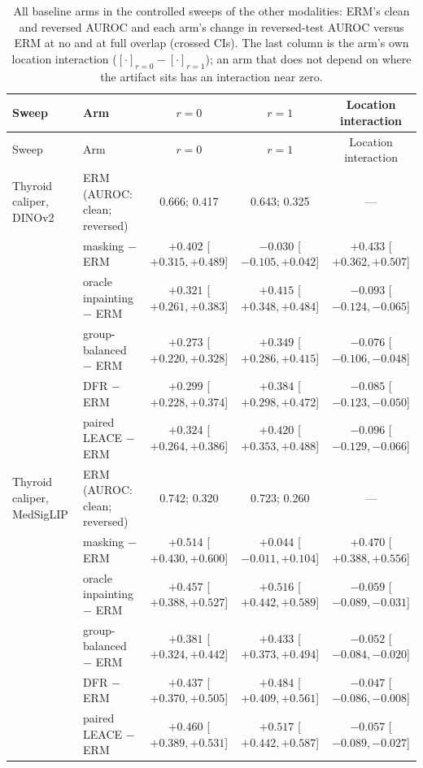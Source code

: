 {\scriptsize
\begin{longtable}{p{2.6cm}p{3.2cm}ccc}
\caption{All baseline arms in the controlled sweeps of the other modalities: ERM's clean and reversed AUROC and each arm's change in reversed-test AUROC versus ERM at no and at full overlap (crossed CIs). The last column is the arm's own location interaction ($[\cdot]_{r=0}-[\cdot]_{r=1}$); an arm that does not depend on where the artifact sits has an interaction near zero.}\label{tab:otherarms}\\\toprule
Sweep & Arm & $r=0$ & $r=1$ & Location interaction \\\midrule
\endfirsthead
\toprule Sweep & Arm & $r=0$ & $r=1$ & Location interaction \\\midrule
\endhead
\bottomrule
\endlastfoot
Thyroid caliper, DINOv2 & ERM (AUROC: clean; reversed) & 0.666; 0.417 & 0.643; 0.325 & --- \\
 & masking $-$ ERM & $+0.402$ [$+0.315, +0.489$] & $-0.030$ [$-0.105, +0.042$] & $+0.433$ [$+0.362, +0.507$] \\
 & oracle inpainting $-$ ERM & $+0.321$ [$+0.261, +0.383$] & $+0.415$ [$+0.348, +0.484$] & $-0.093$ [$-0.124, -0.065$] \\
 & group-balanced $-$ ERM & $+0.273$ [$+0.220, +0.328$] & $+0.349$ [$+0.286, +0.415$] & $-0.076$ [$-0.106, -0.048$] \\
 & DFR $-$ ERM & $+0.299$ [$+0.228, +0.374$] & $+0.384$ [$+0.298, +0.472$] & $-0.085$ [$-0.123, -0.050$] \\
 & paired LEACE $-$ ERM & $+0.324$ [$+0.264, +0.386$] & $+0.420$ [$+0.353, +0.488$] & $-0.096$ [$-0.129, -0.066$] \\
Thyroid caliper, MedSigLIP & ERM (AUROC: clean; reversed) & 0.742; 0.320 & 0.723; 0.260 & --- \\
 & masking $-$ ERM & $+0.514$ [$+0.430, +0.600$] & $+0.044$ [$-0.011, +0.104$] & $+0.470$ [$+0.388, +0.556$] \\
 & oracle inpainting $-$ ERM & $+0.457$ [$+0.388, +0.527$] & $+0.516$ [$+0.442, +0.589$] & $-0.059$ [$-0.089, -0.031$] \\
 & group-balanced $-$ ERM & $+0.381$ [$+0.324, +0.442$] & $+0.433$ [$+0.373, +0.494$] & $-0.052$ [$-0.084, -0.020$] \\
 & DFR $-$ ERM & $+0.437$ [$+0.370, +0.505$] & $+0.484$ [$+0.409, +0.561$] & $-0.047$ [$-0.086, -0.008$] \\
 & paired LEACE $-$ ERM & $+0.460$ [$+0.389, +0.531$] & $+0.517$ [$+0.442, +0.587$] & $-0.057$ [$-0.089, -0.027$] \\

\end{longtable}}
